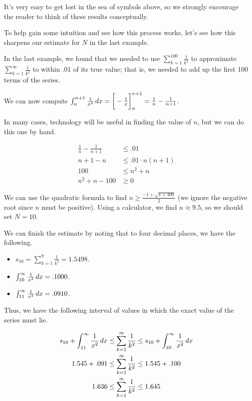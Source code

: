 \documentclass{ximera}
\begin{document}

\begin{warning}
It's very easy to get lost in the sea of symbols above, so we strongly encourage the reader to think of these results conceptually.  
\end{warning}

To help gain some intuition and see how this process works, let's see how this sharpens our estimate for $N$ in the last example.

\begin{model}
In the last example, we found that we needed to use $\sum_{k=1}^{100} \frac{1}{k^2}$ to approximate $\sum_{k=1}^{\infty} \frac{1}{k^2} $ to within $.01$ of its true value; that is, we needed to add up the first $100$ terms of the series.  

We can now compute $\int_n^{n+1} \frac{1}{x^2} \mathop{}\!d x  = \bigg[  -\frac{1}{x}  \bigg]_n^{n+1} = \frac{1}{n}-\frac{1}{n+1}$.

In many cases, technology will be useful in finding the value of $n$, but we can do this one by hand.

\begin{align*}
\frac{1}{n}-\frac{1}{n+1} &\leq .01\\
n+1 - n &\leq .01\cdot n(n+1) \\
100 & \leq n^2+n \\
n^2+n-100 &\geq 0
\end{align*}

We can use the quadratic formula to find $n \geq \frac{-1+\sqrt{1+400}}{2}$ (we ignore the negative root since $n$ must be positive).  Using a calculator, we find $n \approx 9.5$, so we should set $N=10$.

We can finish the estimate by noting that to four decimal places, we have the following.

\begin{itemize}
\item $s_{10} = \sum_{k=1}^{9} \frac{1}{k^2} = 1.5498$.
\item $\int_{10}^\infty \frac{1}{x^2} \mathop{}\!d x = .1000$.
\item $\int_{11}^\infty \frac{1}{x^2} \mathop{}\!d x = .0910$.
\end{itemize}

Thus, we have the following interval of values in which the exact value of the series must lie.

\begin{align*}
s_{10} + \int_{11}^\infty \frac{1}{x^2} \mathop{}\!d x & \leq   \sum_{k=1}^{\infty} \frac{1}{k^2} \leq s_{10} + \int_{10}^\infty \frac{1}{x^2} \mathop{}\!d x \\
1.545 + .091 & \leq  \sum_{k=1}^{\infty} \frac{1}{k^2} \leq 1.545 + .100 \\
1.636 & \leq  \sum_{k=1}^{\infty} \frac{1}{k^2} \leq 1.645
\end{align*}


\end{model}
\end{document}
